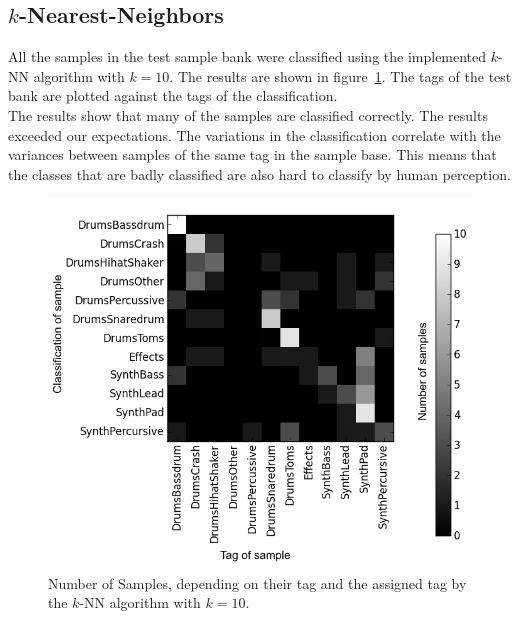 \subsection{$k$-Nearest-Neighbors}
All the samples in the test sample bank were classified using the implemented $k$-NN algorithm with $k=10$. The results are shown in figure~\ref{fig:k-NN}. The tags of the test bank are plotted against the tags of the classification.\\
The results show that many of the samples are classified correctly. The results exceeded our expectations. The variations in the classification correlate with the variances between samples of the same tag in the sample base. This means that the classes that are badly classified are also hard to classify by human perception.

\begin{figure}[htbp]
\centering
\includegraphics[width=0.47\linewidth]{../plots/knn_mod.png}
\caption{Number of Samples, depending on their tag and the assigned tag by the $k$-NN algorithm with $k=10$.}
\label{fig:k-NN}
\end{figure}

